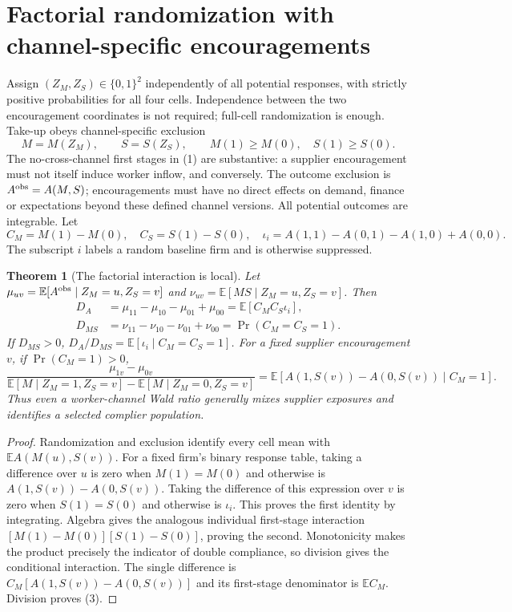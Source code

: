 \documentclass[11pt]{article}
\newtheorem{theorem}{Theorem}
\newcommand{\E}{\mathbb E}
\begin{document}
\section{Factorial randomization with channel-specific encouragements}
Assign $(Z_M,Z_S)\in\{0,1\}^2$ independently of all potential responses,
with strictly positive probabilities for all four cells. Independence
between the two encouragement coordinates is not required; full-cell
randomization is enough. Take-up obeys channel-specific exclusion
\[
 M=M(Z_M),\qquad S=S(Z_S),\qquad
 M(1)\geq M(0),\quad S(1)\geq S(0).                  \tag{1}
\]
The no-cross-channel first stages in (1) are substantive: a supplier
encouragement must not itself induce worker inflow, and conversely.
The outcome exclusion is $A^{\rm obs}=A(M,S)$; encouragements must have
no direct effects on demand, finance or expectations beyond these defined
channel versions. All potential outcomes are integrable. Let
\[
 C_M=M(1)-M(0),\quad C_S=S(1)-S(0),\quad
 \iota_i=A(1,1)-A(0,1)-A(1,0)+A(0,0).
\]
The subscript $i$ labels a random baseline firm and is otherwise suppressed.

\begin{theorem}[The factorial interaction is local]\label{local}
Let $\mu_{uv}=\E[A^{\rm obs}\mid Z_M=u,Z_S=v]$ and
$\nu_{uv}=\E[MS\mid Z_M=u,Z_S=v]$. Then
\begin{align}
 D_A&=\mu_{11}-\mu_{10}-\mu_{01}+\mu_{00}
       =\E[C_MC_S\iota_i],\nonumber\\
 D_{MS}&=\nu_{11}-\nu_{10}-\nu_{01}+\nu_{00}
       =\Pr(C_M=C_S=1).                            \tag{2}
\end{align}
If $D_{MS}>0$, $D_A/D_{MS}=\E[\iota_i\mid C_M=C_S=1]$.
For a fixed supplier encouragement $v$, if $\Pr(C_M=1)>0$,
\[
 \frac{\mu_{1v}-\mu_{0v}}{\E[M\mid Z_M=1,Z_S=v]-
                              \E[M\mid Z_M=0,Z_S=v]}
 =\E[A(1,S(v))-A(0,S(v))\mid C_M=1].                \tag{3}
\]
Thus even a worker-channel Wald ratio generally mixes supplier exposures
and identifies a selected complier population.
\end{theorem}
\begin{proof}
Randomization and exclusion identify every cell mean with
$\E A(M(u),S(v))$. For a fixed firm's binary response table, taking a
difference over $u$ is zero when $M(1)=M(0)$ and otherwise is
$A(1,S(v))-A(0,S(v))$. Taking the difference of this expression over
$v$ is zero when $S(1)=S(0)$ and otherwise is $\iota_i$.
This proves the first identity by integrating. Algebra gives the analogous
individual first-stage interaction
$[M(1)-M(0)][S(1)-S(0)]$, proving the second. Monotonicity makes the
product precisely the indicator of double compliance, so division gives
the conditional interaction. The single difference is
$C_M[A(1,S(v))-A(0,S(v))]$ and its first-stage denominator is $\E C_M$.
Division proves (3).
\end{proof}
\end{document}

